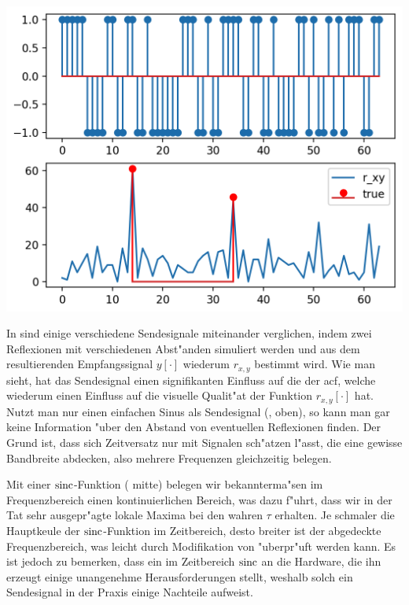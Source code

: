 \begin{listing}[ht]
\begin{minipage}{0.48\textwidth}
        \includegraphics[width=\textwidth]{code/radar_1_3.png}
    \end{minipage}
    \label{py:radar1}
\end{listing}

In  sind einige verschiedene Sendesignale miteinander verglichen, indem zwei Reflexionen mit verschiedenen Abst"anden simuliert werden und aus dem resultierenden Empfangssignal $y[\cdot]$ wiederum $r_{x,y}$ bestimmt wird.
Wie man sieht, hat das Sendesignal einen signifikanten Einfluss auf die  der \gls{acf}, welche wiederum einen Einfluss auf die visuelle Qualit"at der Funktion $r_{x,y}[\cdot]$ hat. 
Nutzt man nur einen einfachen Sinus als Sendesignal (, oben), so kann man gar keine Information "uber den Abstand von eventuellen Reflexionen finden. 
Der Grund ist, dass sich Zeitversatz nur mit Signalen sch"atzen l"asst, die eine gewisse Bandbreite abdecken, also mehrere Frequenzen gleichzeitig belegen.

Mit einer $\operatorname*{sinc}$-Funktion ( mitte) belegen wir bekannterma"sen im Frequenzbereich einen kontinuierlichen Bereich, was dazu f"uhrt, dass wir in der Tat sehr ausgepr"agte lokale Maxima bei den wahren $\tau$ erhalten.
Je schmaler die Hauptkeule der $\operatorname*{sinc}$-Funktion im Zeitbereich, desto breiter ist der abgedeckte Frequenzbereich, was leicht durch Modifikation von  "uberpr"uft werden kann.
Es ist jedoch zu bemerken, dass ein im Zeitbereich  $\operatorname*{sinc}$ an die Hardware, die ihn erzeugt einige unangenehme Herausforderungen stellt, weshalb solch ein Sendesignal in der Praxis einige Nachteile aufweist.

